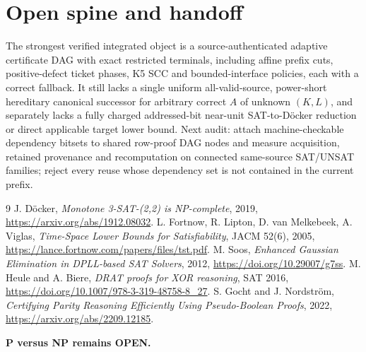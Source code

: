 \documentclass[11pt]{article}
\begin{document}
\section{Open spine and handoff}
The strongest verified integrated object is a source-authenticated adaptive
certificate DAG with exact restricted terminals, including affine prefix cuts,
positive-defect ticket phases, K5 SCC and bounded-interface policies, each with
a correct fallback. It still lacks a single uniform all-valid-source,
power-short hereditary canonical successor for arbitrary correct $A$ of unknown
$(K,L)$, and separately lacks a fully charged addressed-bit near-unit
SAT-to-D\"ocker reduction or direct applicable target lower bound. Next audit:
attach machine-checkable dependency bitsets to shared row-proof DAG nodes and
measure acquisition, retained provenance and recomputation on connected
same-source SAT/UNSAT families; reject every reuse whose dependency set is not
contained in the current prefix.

\begin{thebibliography}{9}
 J. D\"ocker, \emph{Monotone 3-SAT-(2,2) is NP-complete}, 2019,
\url{https://arxiv.org/abs/1912.08032}.
 L. Fortnow, R. Lipton, D. van Melkebeek, A. Viglas,
\emph{Time-Space Lower Bounds for Satisfiability}, JACM 52(6), 2005,
\url{https://lance.fortnow.com/papers/files/tst.pdf}.
 M. Soos, \emph{Enhanced Gaussian Elimination in DPLL-based SAT
Solvers}, 2012, \url{https://doi.org/10.29007/g7ss}.
 M. Heule and A. Biere, \emph{DRAT proofs for XOR reasoning},
SAT 2016, \url{https://doi.org/10.1007/978-3-319-48758-8_27}.
 S. Gocht and J. Nordstr\"om, \emph{Certifying Parity Reasoning
Efficiently Using Pseudo-Boolean Proofs}, 2022,
\url{https://arxiv.org/abs/2209.12185}.
\end{thebibliography}

\noindent\textbf{P versus NP remains OPEN.}
\end{document}
